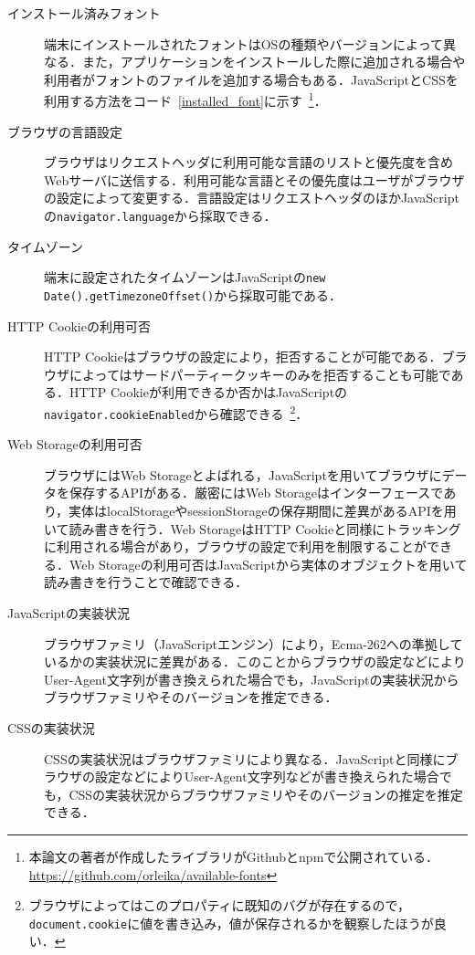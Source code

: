 \begin{description}
  \item[インストール済みフォント]端末にインストールされたフォントはOSの種類やバージョンによって異なる．また，アプリケーションをインストールした際に追加される場合や利用者がフォントのファイルを追加する場合もある．JavaScriptとCSSを利用する方法をコード~\ref{installed_font}に示す~\footnote{本論文の著者が作成したライブラリがGithubとnpmで公開されている．\url{https://github.com/orleika/available-fonts}}．
  


\item[ブラウザの言語設定]ブラウザはリクエストヘッダに利用可能な言語のリストと優先度を含めWebサーバに送信する．利用可能な言語とその優先度はユーザがブラウザの設定によって変更する．言語設定はリクエストヘッダのほかJavaScriptの\texttt{navigator.language}から採取できる．
\item[タイムゾーン]端末に設定されたタイムゾーンはJavaScriptの\texttt{new Date().getTimezoneOffset()}から採取可能である．
\item[HTTP Cookieの利用可否]HTTP Cookieはブラウザの設定により，拒否することが可能である．ブラウザによってはサードパーティークッキーのみを拒否することも可能である．HTTP Cookieが利用できるか否かはJavaScriptの\texttt{navigator.cookieEnabled}から確認できる~\footnote{ブラウザによってはこのプロパティに既知のバグが存在するので，\texttt{document.cookie}に値を書き込み，値が保存されるかを観察したほうが良い．}．
\item[Web Storageの利用可否]ブラウザにはWeb Storageとよばれる，JavaScriptを用いてブラウザにデータを保存するAPIがある．厳密にはWeb Storageはインターフェースであり，実体はlocalStorageやsessionStorageの保存期間に差異があるAPIを用いて読み書きを行う．Web StorageはHTTP Cookieと同様にトラッキングに利用される場合があり，ブラウザの設定で利用を制限することができる．Web Storageの利用可否はJavaScriptから実体のオブジェクトを用いて読み書きを行うことで確認できる．
\item[JavaScriptの実装状況]ブラウザファミリ（JavaScriptエンジン）により，Ecma-262への準拠しているかの実装状況に差異がある．このことからブラウザの設定などによりUser-Agent文字列が書き換えられた場合でも，JavaScriptの実装状況からブラウザファミリやそのバージョンを推定できる．
\item[CSSの実装状況]CSSの実装状況はブラウザファミリにより異なる．JavaScriptと同様にブラウザの設定などによりUser-Agent文字列などが書き換えられた場合でも，CSSの実装状況からブラウザファミリやそのバージョンの推定を推定できる．

\end{description}
